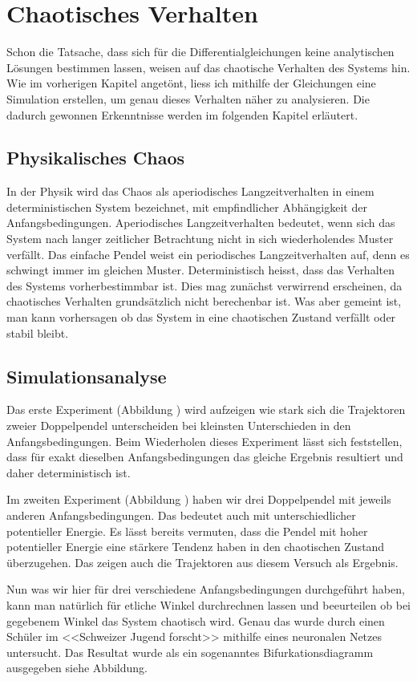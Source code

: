 \section{Chaotisches Verhalten}
Schon die Tatsache, dass sich für die Differentialgleichungen keine 
analytischen Lösungen bestimmen lassen, weisen auf das chaotische Verhalten
des Systems hin.
Wie im vorherigen Kapitel angetönt, liess ich mithilfe der Gleichungen eine Simulation
erstellen, um genau dieses Verhalten näher zu analysieren.
Die dadurch gewonnen Erkenntnisse werden im folgenden Kapitel erläutert.

\subsection{Physikalisches Chaos}
In der Physik wird das Chaos als aperiodisches Langzeitverhalten in einem deterministischen
System bezeichnet, mit empfindlicher Abhängigkeit der Anfangsbedingungen.
Aperiodisches Langzeitverhalten bedeutet, wenn sich das System nach langer zeitlicher Betrachtung
nicht in sich wiederholendes Muster verfällt.
Das einfache Pendel weist ein periodisches Langzeitverhalten auf, denn es schwingt immer im gleichen 
Muster.
Deterministisch heisst, dass das Verhalten des Systems vorherbestimmbar ist.
Dies mag zunächst verwirrend erscheinen, da chaotisches Verhalten grundsätzlich nicht
berechenbar ist.
Was aber gemeint ist, man kann vorhersagen ob das System in eine chaotischen Zustand 
verfällt oder stabil bleibt.

\subsection{Simulationsanalyse}
Das erste Experiment (Abbildung ) wird aufzeigen wie stark sich die Trajektoren zweier Doppelpendel unterscheiden
bei kleinsten Unterschieden in den Anfangsbedingungen.
Beim Wiederholen dieses Experiment lässt sich feststellen, dass für exakt dieselben Anfangsbedingungen
das gleiche Ergebnis resultiert und daher deterministisch ist.

Im zweiten Experiment (Abbildung ) haben wir drei Doppelpendel mit jeweils anderen Anfangsbedingungen.
Das bedeutet auch mit unterschiedlicher potentieller Energie.
Es lässt bereits vermuten, dass die Pendel mit hoher potentieller Energie eine stärkere Tendenz haben
in den chaotischen Zustand überzugehen.
Das zeigen auch die Trajektoren aus diesem Versuch als Ergebnis.

Nun was wir hier für drei verschiedene Anfangsbedingungen durchgeführt haben, kann man natürlich
für etliche Winkel durchrechnen lassen und beeurteilen ob bei gegebenem Winkel das System chaotisch wird.
Genau das wurde durch einen Schüler im <<Schweizer Jugend forscht>> mithilfe eines neuronalen Netzes
untersucht. %
Das Resultat wurde als ein sogenanntes Bifurkationsdiagramm ausgegeben siehe Abbildung.
